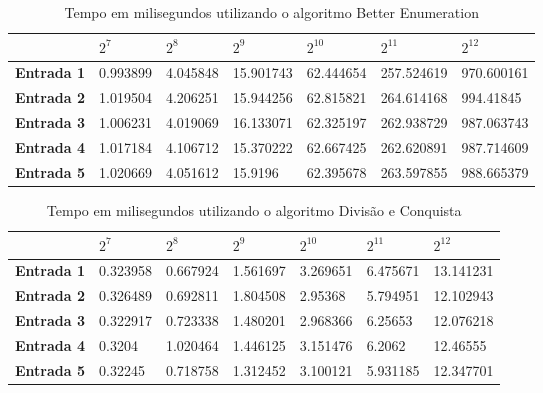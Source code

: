 \documentclass[
	12pt,				%
	oneside,   	        %
	a4paper,			%
	english,			%
	french,				%
	spanish,			%
	brazil,				%
	]{pacotes/abntex2}
\begin{document}
\begin{apendicesenv}
\begin{table}[!htb]
\centering
\caption{Tempo em milisegundos utilizando o algoritmo Better Enumeration}
\label{tab:java14}
\footnotesize   %
\begin{tabular}{l|llllll}
\toprule
& \textbf{$2^7$} & \textbf{$2^8$} & \textbf{$2^9$} & \textbf{$2^{10}$} & \textbf{$2^{11}$} & \textbf{$2^{12}$}\\ 
\midrule
\textbf{Entrada 1} & 0.993899 & 4.045848 &	15.901743 &	62.444654 &	257.524619 & 970.600161\\
\textbf{Entrada 2} & 1.019504 & 4.206251 &	15.944256 &	62.815821 &	264.614168 & 994.41845\\
\textbf{Entrada 3} & 1.006231 & 4.019069 &	16.133071 &	62.325197 &	262.938729 & 987.063743\\
\textbf{Entrada 4} & 1.017184 & 4.106712 &	15.370222 &	62.667425 &	262.620891 & 987.714609\\
\textbf{Entrada 5} & 1.020669 & 4.051612 &	15.9196 &	62.395678 &	263.597855 & 988.665379\\
 \bottomrule
\end{tabular}
\end{table}

\begin{table}[!htb]
\centering
\caption{Tempo em milisegundos utilizando o algoritmo Divisão e Conquista}
\label{tab:java15}
\footnotesize   %
\begin{tabular}{l|llllll}
\toprule
& \textbf{$2^7$} & \textbf{$2^8$} & \textbf{$2^9$} & \textbf{$2^{10}$} & \textbf{$2^{11}$} & \textbf{$2^{12}$}\\ 
\midrule
\textbf{Entrada 1} & 0.323958 &	0.667924 &	1.561697 &	3.269651 &	6.475671 &	13.141231\\
\textbf{Entrada 2} & 0.326489 &	0.692811 &	1.804508 &	2.95368 &	5.794951 &	12.102943\\
\textbf{Entrada 3} & 0.322917 &	0.723338 &	1.480201 &	2.968366 &	6.25653 &	12.076218\\
\textbf{Entrada 4} & 0.3204 &	1.020464 &	1.446125 &	3.151476 &	6.2062 &	12.46555\\
\textbf{Entrada 5} & 0.32245 &	0.718758 &	1.312452 &	3.100121 &	5.931185 &	12.347701\\

 \bottomrule
\end{tabular}
\end{table}


\end{apendicesenv}
\end{document}
